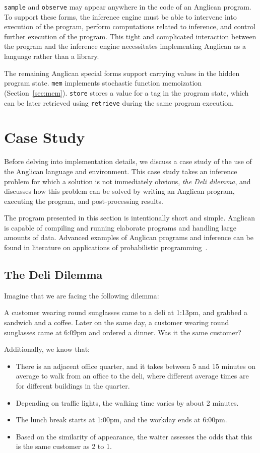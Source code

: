 \documentclass[sigconf]{acmart}
\begin{document}
\texttt{sample} and \texttt{observe} may appear anywhere in the
code of an Anglican program. To support these forms, the
inference engine must be able to intervene into execution of the
program, perform computations related to inference, and control
further execution of the program. This tight and complicated
interaction between the program and the inference engine
necessitates implementing Anglican as a language rather than a
library.

The remaining Anglican special forms support carrying values in
the hidden program state. \texttt{mem} implements stochastic
function memoization (Section~\ref{sec:mem}). \texttt{store}
stores a value for a tag in the program state, which can be
later retrieved using \texttt{retrieve} during the same
program execution.

\section{Case Study}
\label{seq:study}

Before delving into implementation details, we discuss a case study
of the use of the Anglican language and environment. This case study
takes an inference problem for which a solution is not immediately
obvious, \textit{the Deli dilemma}, and discusses how this problem
can be solved by writing an Anglican program, executing the program,
and post-processing results.

The program presented in this section is intentionally short and
simple. Anglican is capable of compiling and running elaborate
programs and handling large amounts of data. Advanced examples of
Anglican programs and inference can be found in literature on
applications of probabilistic programming~\cite{PLW15, P16, MPT+16}.

\subsection{The Deli Dilemma}
\label{seq:deli}

Imagine that we are facing the following dilemma:

A customer wearing round sunglasses came to a deli at 1:13pm,
and grabbed a sandwich and a coffee. Later on the same day, a
customer wearing round sunglasses came at 6:09pm and ordered a
dinner.  Was it the same customer?

Additionally, we know that:
\begin{itemize}
    \item There is an adjacent office quarter, and it takes
        between 5 and 15 minutes on average to walk from an
        office to the deli, where different average times are  for
        different buildings in the quarter.
    \item Depending on traffic lights, the walking time varies by about 2
        minutes.
    \item The lunch break starts at 1:00pm, and the workday ends at 6:00pm.
    \item Based on the similarity of appearance, the waiter assesses the odds that this is the same customer as 2 to 1.
\end{itemize}
\end{document}
